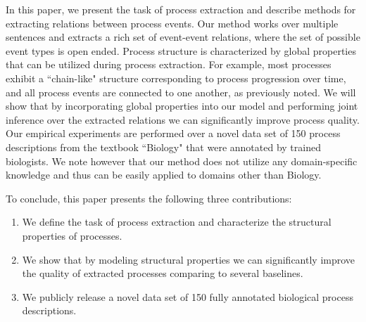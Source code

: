 In this paper, we present the task of process extraction and describe methods for extracting relations between process events. Our method works over multiple sentences and extracts a rich set of event-event relations, where the set of possible event types is open ended. Process structure is characterized by global properties that can be utilized during process extraction. For example, most processes exhibit a ``chain-like" structure corresponding to process progression over time, and all process events are connected to one another, as previously noted. We will show that by incorporating global properties into our model and performing joint inference over the extracted relations we can significantly improve process quality.  Our empirical experiments are performed over a novel data set of 150 process descriptions from the textbook ``Biology" \cite{CampbellReece} that were annotated by trained biologists. We note however that our method does not utilize any domain-specific knowledge and thus can be easily applied to domains other than Biology.

To conclude, this paper presents the following three contributions:
\begin{enumerate}[itemsep=0pt,topsep=0pt] 
\item We define the task of process extraction and characterize the structural properties of processes.
\item We show that by modeling structural properties we can significantly improve the quality of extracted processes comparing to several baselines.
\item  We publicly release a novel data set of 150 fully annotated biological process descriptions.
\end{enumerate}
